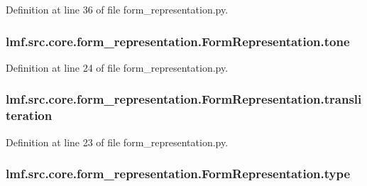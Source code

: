 Definition at line 36 of file form\+\_\+representation.\+py.

\hypertarget{classlmf_1_1src_1_1core_1_1form__representation_1_1_form_representation_a2cfea0271f8abfcffb74afb7641ef4df}{
\subsubsection[{tone}]{\setlength{\rightskip}{0pt plus 5cm}lmf.\+src.\+core.\+form\+\_\+representation.\+Form\+Representation.\+tone}}\label{classlmf_1_1src_1_1core_1_1form__representation_1_1_form_representation_a2cfea0271f8abfcffb74afb7641ef4df}


Definition at line 24 of file form\+\_\+representation.\+py.

\hypertarget{classlmf_1_1src_1_1core_1_1form__representation_1_1_form_representation_ab192387108c3c4e780297d1b409d5eff}{
\subsubsection[{transliteration}]{\setlength{\rightskip}{0pt plus 5cm}lmf.\+src.\+core.\+form\+\_\+representation.\+Form\+Representation.\+transliteration}}\label{classlmf_1_1src_1_1core_1_1form__representation_1_1_form_representation_ab192387108c3c4e780297d1b409d5eff}


Definition at line 23 of file form\+\_\+representation.\+py.

\hypertarget{classlmf_1_1src_1_1core_1_1form__representation_1_1_form_representation_a26785ac6e2bf05ebefb60d1c019db55d}{
\subsubsection[{type}]{\setlength{\rightskip}{0pt plus 5cm}lmf.\+src.\+core.\+form\+\_\+representation.\+Form\+Representation.\+type}}\label{classlmf_1_1src_1_1core_1_1form__representation_1_1_form_representation_a26785ac6e2bf05ebefb60d1c019db55d}


